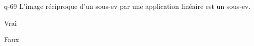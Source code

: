 \begin{truefalse}{q-69}
L'image réciproque d'un sous-ev par une application linéaire est un sous-ev.
\item* Vrai
\item Faux
\end{truefalse}

